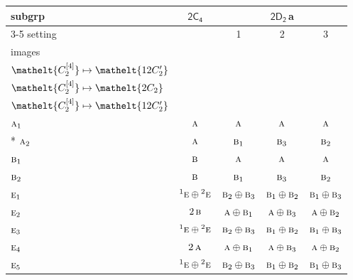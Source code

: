 \documentclass[10pt,a4paper]{article}
\numberwithin{equation}{section}
\newcommand{\eltfont}[1]{{\let\sigma\eltsigma\mathelt{#1}}}
\newcommand{\grp}[1]{\mathsf{#1}}
\newcommand{\irr}[1]{\text{\normalfont\scshape #1}}
\newcommand{\conjpair}[1]{{}^{#1}}
\newcommand{\cls}[1]{\eltfont{#1}}
\newcommand{\clsletter}[1]{\,{\scriptsize\color{black!55}#1}}
\newcommand{\genidx}[2]{#1^{[\mathrm{#2}]}}
\begin{document}
{\small\begin{longtable}{@{}lcccc@{}}\toprule
subgrp & \href{2C4.pdf}{$\grp{2C_{4}}$} & \multicolumn{3}{c}{\href{2D2.pdf}{$\grp{2D_{2}}$}\clsletter{a}}\\\cmidrule(lr){3-5}
setting &  & 1 & 2 & 3\\
images &  & {\scriptsize\begin{tabular}[t]{@{}c@{}}$\cls{\genidx{C_{2}}{2}} \mapsto \cls{2C_{2}}$\\$\cls{\genidx{C_{2}}{4}} \mapsto \cls{12C_{2}'}$\end{tabular}} & {\scriptsize\begin{tabular}[t]{@{}c@{}}$\cls{\genidx{C_{2}}{2}} \mapsto \cls{12C_{2}'}$\\$\cls{\genidx{C_{2}}{4}} \mapsto \cls{2C_{2}}$\end{tabular}} & {\scriptsize\begin{tabular}[t]{@{}c@{}}$\cls{\genidx{C_{2}}{2}} \mapsto \cls{12C_{2}'}$\\$\cls{\genidx{C_{2}}{4}} \mapsto \cls{12C_{2}'}$\end{tabular}}\\\midrule\endhead
\bottomrule\endfoot\endlastfoot
$\irr{a}_{1}$ & $\irr{a}$ & $\irr{a}$ & $\irr{a}$ & $\irr{a}$\\*
$\irr{a}_{2}$ & $\irr{a}$ & $\irr{b}_{1}$ & $\irr{b}_{3}$ & $\irr{b}_{2}$\\
$\irr{b}_{1}$ & $\irr{b}$ & $\irr{a}$ & $\irr{a}$ & $\irr{a}$\\
$\irr{b}_{2}$ & $\irr{b}$ & $\irr{b}_{1}$ & $\irr{b}_{3}$ & $\irr{b}_{2}$\\
$\irr{e}_{1}$ & $\conjpair{1}\irr{e}\oplus \conjpair{2}\irr{e}$ & $\irr{b}_{2}\oplus \irr{b}_{3}$ & $\irr{b}_{1}\oplus \irr{b}_{2}$ & $\irr{b}_{1}\oplus \irr{b}_{3}$\\
$\irr{e}_{2}$ & $2\,\irr{b}$ & $\irr{a}\oplus \irr{b}_{1}$ & $\irr{a}\oplus \irr{b}_{3}$ & $\irr{a}\oplus \irr{b}_{2}$\\
$\irr{e}_{3}$ & $\conjpair{1}\irr{e}\oplus \conjpair{2}\irr{e}$ & $\irr{b}_{2}\oplus \irr{b}_{3}$ & $\irr{b}_{1}\oplus \irr{b}_{2}$ & $\irr{b}_{1}\oplus \irr{b}_{3}$\\
$\irr{e}_{4}$ & $2\,\irr{a}$ & $\irr{a}\oplus \irr{b}_{1}$ & $\irr{a}\oplus \irr{b}_{3}$ & $\irr{a}\oplus \irr{b}_{2}$\\
$\irr{e}_{5}$ & $\conjpair{1}\irr{e}\oplus \conjpair{2}\irr{e}$ & $\irr{b}_{2}\oplus \irr{b}_{3}$ & $\irr{b}_{1}\oplus \irr{b}_{2}$ & $\irr{b}_{1}\oplus \irr{b}_{3}$\\

\end{longtable}}
\end{document}
